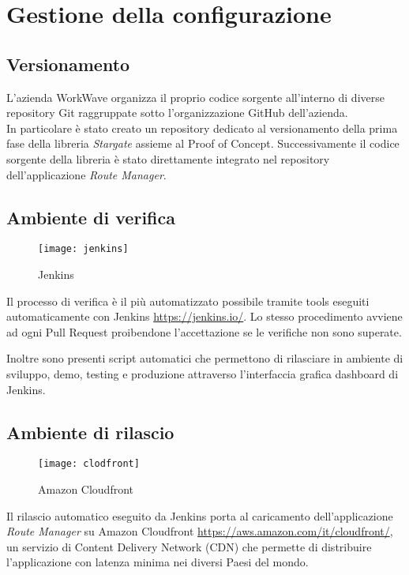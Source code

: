 \section{Gestione della configurazione}

\subsection{Versionamento}

L'azienda WorkWave organizza il proprio codice sorgente all'interno di diverse repository Git raggruppate sotto l'organizzazione GitHub dell'azienda. \\

In particolare è stato creato un repository dedicato al versionamento della prima fase della libreria \textit{Stargate} assieme al Proof of Concept. Successivamente il codice sorgente della libreria è stato direttamente integrato nel repository dell'applicazione \textit{Route Manager}.

\subsection{Ambiente di verifica}

\begin{figure}[H] 
  \centering 
  \texttt{[image: jenkins]} 
  \caption{Jenkins}
\end{figure}

Il processo di verifica è il più automatizzato possibile tramite tools eseguiti automaticamente con Jenkins \url{https://jenkins.io/}. Lo stesso procedimento avviene ad ogni Pull Request proibendone l’accettazione se le verifiche non sono superate.

Inoltre sono presenti script automatici che permettono di rilasciare in ambiente di sviluppo, demo, testing e produzione attraverso l'interfaccia grafica dashboard di Jenkins.

\subsection{Ambiente di rilascio}

\begin{figure}[H] 
  \centering 
  \texttt{[image: clodfront]} 
  \caption{Amazon Cloudfront}
\end{figure}

Il rilascio automatico eseguito da Jenkins porta al caricamento dell'applicazione \textit{Route Manager} su Amazon Cloudfront \url{https://aws.amazon.com/it/cloudfront/}, un servizio di Content Delivery Network (CDN) che permette di distribuire l'applicazione con latenza minima nei diversi Paesi del mondo.

